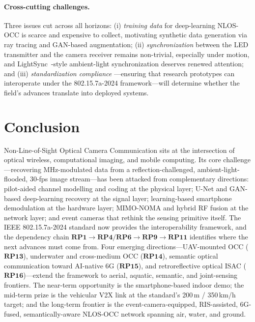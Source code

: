 \documentclass[10pt,a4paper]{article}
\newcommand{\rp}[1]{\textbf{RP#1}}
\begin{document}
\paragraph{Cross-cutting challenges.}
Three issues cut across all horizons: (i) \emph{training data} for
deep-learning NLOS-OCC is scarce and expensive to collect, motivating
synthetic data generation via ray tracing and GAN-based augmentation;
(ii) \emph{synchronization} between the LED transmitter and the camera
receiver remains non-trivial, especially under motion, and
LightSync~\cite{lightsync2013}-style ambient-light synchronization
deserves renewed attention; and (iii) \emph{standardization compliance}
---ensuring that research prototypes can interoperate under the
802.15.7a-2024 framework---will determine whether the field's advances
translate into deployed systems.

\section{Conclusion}
\label{sec:conclusion}

Non-Line-of-Sight Optical Camera Communication sits at the intersection
of optical wireless, computational imaging, and mobile computing. Its
core challenge---recovering MHz-modulated data from a reflection-challenged,
ambient-light-flooded, 30-fps image stream---has been attacked from
complementary directions: pilot-aided channel modelling and coding at
the physical layer; U-Net and GAN-based deep-learning recovery at the
signal layer; learning-based smartphone demodulation at the hardware layer;
MIMO-NOMA and hybrid RF fusion at the network layer; and event cameras
that rethink the sensing primitive itself. The IEEE 802.15.7a-2024
standard now provides the interoperability framework, and the
dependency chain $\rp{1}\rightarrow\rp{4}/\rp{6}\rightarrow\rp{9}
\rightarrow\rp{11}$ identifies where the next advances must come from.
Four emerging directions---UAV-mounted OCC ($\rp{13}$), underwater and
cross-medium OCC ($\rp{14}$), semantic optical communication toward
AI-native 6G ($\rp{15}$), and retroreflective optical ISAC
($\rp{16}$)---extend the framework to aerial, aquatic, semantic, and
joint-sensing frontiers. The near-term opportunity is the smartphone-based indoor demo; the
mid-term prize is the vehicular V2X link at the standard's 200\,m /
350\,km/h target; and the long-term frontier is the event-camera-equipped,
RIS-assisted, 6G-fused, semantically-aware NLOS-OCC network spanning
air, water, and ground.



\end{document}
